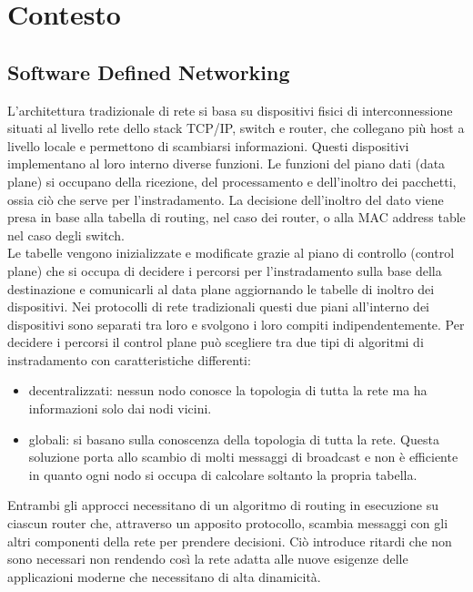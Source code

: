 \chapter{Contesto}
\section{Software Defined Networking}
\label{ch:SDN}

L'architettura tradizionale di rete si basa su dispositivi fisici di interconnessione situati al livello rete dello stack TCP/IP, switch e router, che collegano più host a livello locale e permettono di scambiarsi informazioni.
Questi dispositivi implementano al loro interno diverse funzioni. 
Le funzioni del piano dati (data plane) si occupano della ricezione, del processamento e dell'inoltro dei pacchetti, ossia ciò che serve per l'instradamento. La decisione dell'inoltro del dato 
viene presa in base alla tabella di routing, nel caso dei router, o alla MAC address table nel caso degli switch. 
\\Le tabelle vengono inizializzate e modificate grazie al piano di controllo (control plane) che si occupa di decidere i percorsi 
per l'instradamento sulla base della destinazione e comunicarli al data plane aggiornando le tabelle di inoltro dei dispositivi. 
Nei protocolli di rete tradizionali questi due piani all'interno dei dispositivi sono separati tra loro e svolgono i loro compiti indipendentemente.
Per decidere i percorsi il control plane può scegliere tra due tipi di algoritmi di instradamento con caratteristiche differenti: 
\begin{itemize}
\item decentralizzati: nessun nodo conosce la topologia di tutta la rete ma ha informazioni solo dai nodi vicini. 
\item globali: si basano sulla conoscenza della topologia di tutta la rete. Questa soluzione
porta allo scambio di molti messaggi di broadcast e non è efficiente in quanto ogni
nodo si occupa di calcolare soltanto la propria tabella.
\end{itemize}
Entrambi gli approcci necessitano di un algoritmo di routing in esecuzione su ciascun router che, attraverso un apposito protocollo, 
scambia messaggi con gli altri componenti della rete per prendere decisioni. 
Ciò introduce ritardi che non sono necessari non rendendo così la rete adatta alle nuove esigenze delle applicazioni moderne che necessitano di alta dinamicità.
